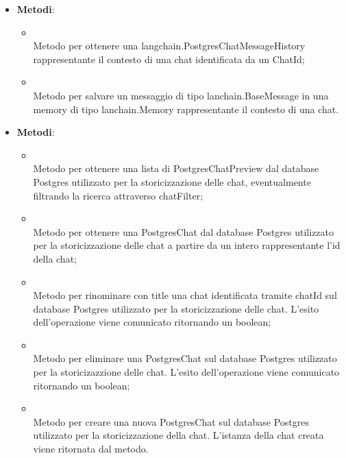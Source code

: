 \documentclass[10pt, a4paper]{article}
\begin{document}
    \label{ChatHistoryManagerDettaglio}
    \begin{itemize}
        \item \textbf{Metodi}:
        \begin{itemize}
            \item {}\\
            Metodo per ottenere una langchain.PostgresChatMessageHistory rappresentante il contesto di una chat identificata da un ChatId;
            \item {}\\
            Metodo per salvare un messaggio di tipo lanchain.BaseMessage in una memory di tipo lanchain.Memory rappresentante il contesto di una chat. 
        \end{itemize}
    \end{itemize}
    
    \label{PostgresORMDettaglio}
    \begin{itemize}
        \item \textbf{Metodi}:
        \begin{itemize}
            \item {}\\
            Metodo per ottenere una lista di PostgresChatPreview dal database Postgres utilizzato per la storicizzazione delle chat, eventualmente filtrando la ricerca attraverso chatFilter;
            \item {}\\
            Metodo per ottenere una PostgresChat dal database Postgres utilizzato per la storicizzazione delle chat a partire da un intero rappresentante l'id della chat;
            \item {}\\
            Metodo per rinominare con title una chat identificata tramite chatId sul database Postgres utilizzato per la storicizzazione delle chat. L'esito dell'operazione viene comunicato ritornando un boolean;  
            \item {}\\
            Metodo per eliminare una PostgresChat sul database Postgres utilizzato per la storicizazzione delle chat. L'esito dell'operazione viene comunicato ritornando un boolean;        
            \item {}\\
            Metodo per creare una nuova PostgresChat sul database Postgres utilizzato per la storicizzazione della chat. L'istanza della chat creata viene ritornata dal metodo.
        \end{itemize}
    \end{itemize}
    
\end{document}
